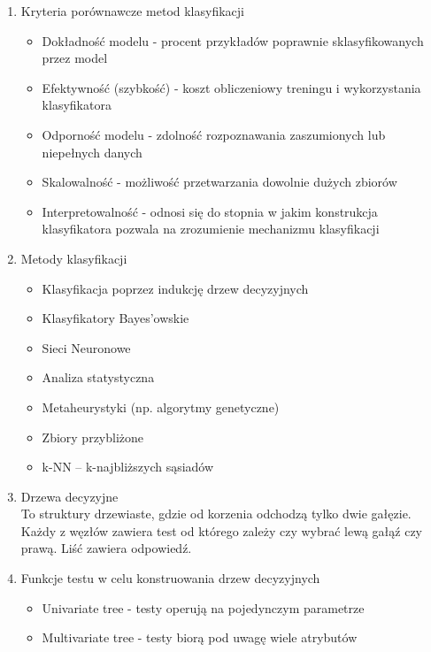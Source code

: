 \documentclass[11pt]{article}
\begin{document}
\begin{enumerate}
        \item Kryteria porównawcze metod klasyfikacji
        \begin{itemize}
        	\item Dokładność modelu - procent przykładów poprawnie sklasyfikowanych
        	przez model
        	\item Efektywność (szybkość) - koszt obliczeniowy treningu i wykorzystania klasyfikatora
        	\item Odporność modelu - zdolność rozpoznawania zaszumionych lub niepełnych danych
        	\item Skalowalność - możliwość przetwarzania dowolnie dużych zbiorów
        	\item Interpretowalność - odnosi się do stopnia w jakim konstrukcja klasyfikatora pozwala na zrozumienie mechanizmu klasyfikacji
        \end{itemize}
        \clearpage
        
        \item Metody klasyfikacji
        \begin{itemize}
        	\item Klasyfikacja poprzez indukcję drzew decyzyjnych
        	\item Klasyfikatory Bayes’owskie
        	\item Sieci Neuronowe
        	\item Analiza statystyczna
        	\item Metaheurystyki (np. algorytmy genetyczne)
        	\item Zbiory przybliżone
        	\item k-NN – k-najbliższych sąsiadów
        \end{itemize}
        
        \item Drzewa decyzyjne \\
        To struktury drzewiaste, gdzie od korzenia odchodzą tylko dwie gałęzie.
        Każdy z węzłów zawiera test od którego zależy czy wybrać lewą gałąź czy
        prawą. Liść zawiera odpowiedź.
        
        \item Funkcje testu w celu konstruowania drzew decyzyjnych
        \begin{itemize}
        	\item Univariate tree - testy operują na pojedynczym parametrze
        	\item Multivariate tree - testy biorą pod uwagę wiele atrybutów
        \end{itemize}
        

\end{enumerate}
\end{document}
